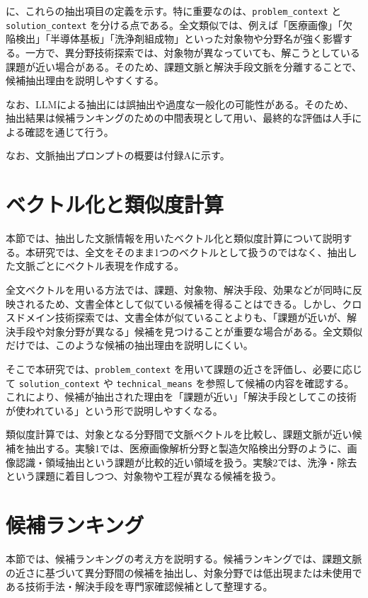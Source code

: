 に、これらの抽出項目の定義を示す。特に重要なのは、\texttt{problem\_context} と \texttt{solution\_context} を分ける点である。全文類似では、例えば「医療画像」「欠陥検出」「半導体基板」「洗浄剤組成物」といった対象物や分野名が強く影響する。一方で、異分野技術探索では、対象物が異なっていても、解こうとしている課題が近い場合がある。そのため、課題文脈と解決手段文脈を分離することで、候補抽出理由を説明しやすくする。

なお、LLMによる抽出には誤抽出や過度な一般化の可能性がある。そのため、抽出結果は候補ランキングのための中間表現として用い、最終的な評価は人手による確認を通じて行う。

なお、文脈抽出プロンプトの概要は付録Aに示す。

\section{ベクトル化と類似度計算}

本節では、抽出した文脈情報を用いたベクトル化と類似度計算について説明する。本研究では、全文をそのまま1つのベクトルとして扱うのではなく、抽出した文脈ごとにベクトル表現を作成する。

全文ベクトルを用いる方法では、課題、対象物、解決手段、効果などが同時に反映されるため、文書全体として似ている候補を得ることはできる。しかし、クロスドメイン技術探索では、文書全体が似ていることよりも、「課題が近いが、解決手段や対象分野が異なる」候補を見つけることが重要な場合がある。全文類似だけでは、このような候補の抽出理由を説明しにくい。

そこで本研究では、\texttt{problem\_context} を用いて課題の近さを評価し、必要に応じて \texttt{solution\_context} や \texttt{technical\_means} を参照して候補の内容を確認する。これにより、候補が抽出された理由を「課題が近い」「解決手段としてこの技術が使われている」という形で説明しやすくなる。

類似度計算では、対象となる分野間で文脈ベクトルを比較し、課題文脈が近い候補を抽出する。実験1では、医療画像解析分野と製造欠陥検出分野のように、画像認識・領域抽出という課題が比較的近い領域を扱う。実験2では、洗浄・除去という課題に着目しつつ、対象物や工程が異なる候補を扱う。

\section{候補ランキング}

本節では、候補ランキングの考え方を説明する。候補ランキングでは、課題文脈の近さに基づいて異分野間の候補を抽出し、対象分野では低出現または未使用である技術手法・解決手段を専門家確認候補として整理する。

